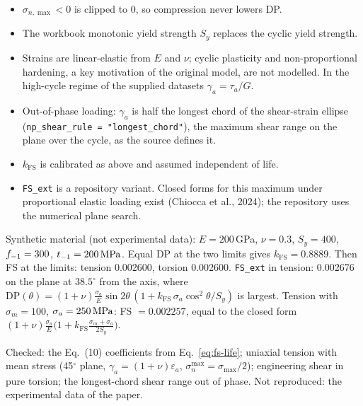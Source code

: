 \begin{itemize}
\item $\sigma_{n,\max}<0$ is clipped to 0, so compression never lowers DP.
\item The workbook monotonic yield strength $S_y$ replaces the cyclic yield strength.
\item Strains are linear-elastic from $E$ and $\nu$; cyclic plasticity and non-proportional
  hardening, a key motivation of the original model, are not modelled. In the high-cycle regime of
  the supplied datasets $\gamma_a=\tau_a/G$.
\item Out-of-phase loading: $\gamma_a$ is half the longest chord of the shear-strain ellipse
  (\texttt{np\_shear\_rule = "longest\_chord"}), the maximum shear range on the plane over the
  cycle, as the source defines it.
\item $k_\mathrm{FS}$ is calibrated as above and assumed independent of life.
\item \texttt{FS\_ext} is a repository variant. Closed forms for this maximum under proportional
  elastic loading exist (Chiocca et al., 2024); the repository uses the numerical plane search.
\end{itemize}

 Synthetic material (not experimental data): $E=200$\,GPa, $\nu=0.3$,
$S_y=400$, $f_{-1}=300$, $t_{-1}=200\,\mathrm{MPa}$. Equal DP at the two limits gives $k_\mathrm{FS}=0.8889$. Then
FS at the limits: tension 0.002600, torsion 0.002600. \texttt{FS\_ext} in tension: 0.002676 on the
plane at $38.5^\circ$ from the axis, where
$\mathrm{DP}(\theta)=(1+\nu)\frac{\sigma_a}{E}\sin2\theta\,(1+k_\mathrm{FS}\,\sigma_a\cos^2\theta/S_y)$
is largest. Tension with $\sigma_m=100$, $\sigma_a=250\,\mathrm{MPa}$: FS $=0.002257$, equal to the closed form
$(1+\nu)\frac{\sigma_a}{E}\bigl(1+k_\mathrm{FS}\frac{\sigma_m+\sigma_a}{2S_y}\bigr)$.

 Checked: the Eq.~(10) coefficients from Eq.~\eqref{eq:fs-life}; uniaxial
tension with mean stress (45$^\circ$ plane, $\gamma_a=(1+\nu)\varepsilon_a$,
$\sigma_n^{\max}=\sigma_{\max}/2$); engineering shear in pure torsion; the longest-chord shear range
out of phase. Not reproduced: the experimental data of the paper.
